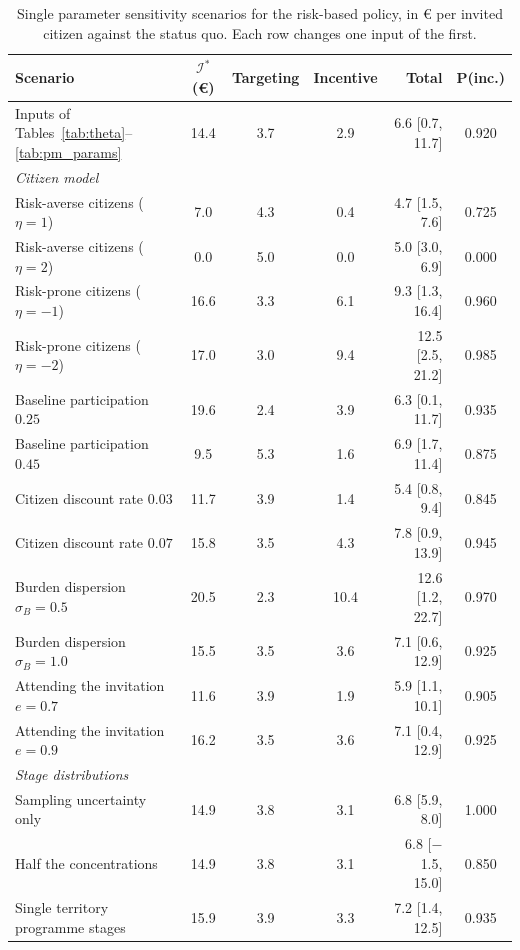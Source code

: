 \documentclass[12pt]{article}
\begin{document}
\begin{table}[h!]
\centering
\footnotesize
\caption{Single parameter sensitivity scenarios for the risk-based policy, in € per invited citizen against the status quo. Each row changes one input of the first.}
\label{tab:sensitivity}
\begin{tabular}{l c c c r c}
\toprule
\textbf{Scenario} & $\mathcal{I}^*$ (€) & \textbf{Targeting} & \textbf{Incentive} & \textbf{Total} & \textbf{P(inc.)} \\
\midrule
Inputs of Tables~\ref{tab:theta}--\ref{tab:pm_params} & 14.4 & 3.7 & 2.9 & 6.6 [0.7, 11.7] & 0.920 \\
\midrule
\multicolumn{6}{l}{\emph{Citizen model}} \\
Risk-averse citizens ($\eta = 1$) & 7.0 & 4.3 & 0.4 & 4.7 [1.5, 7.6] & 0.725 \\
Risk-averse citizens ($\eta = 2$) & 0.0 & 5.0 & 0.0 & 5.0 [3.0, 6.9] & 0.000 \\
Risk-prone citizens ($\eta = -1$) & 16.6 & 3.3 & 6.1 & 9.3 [1.3, 16.4] & 0.960 \\
Risk-prone citizens ($\eta = -2$) & 17.0 & 3.0 & 9.4 & 12.5 [2.5, 21.2] & 0.985 \\
Baseline participation $0.25$ & 19.6 & 2.4 & 3.9 & 6.3 [0.1, 11.7] & 0.935 \\
Baseline participation $0.45$ & 9.5 & 5.3 & 1.6 & 6.9 [1.7, 11.4] & 0.875 \\
Citizen discount rate $0.03$ & 11.7 & 3.9 & 1.4 & 5.4 [0.8, 9.4] & 0.845 \\
Citizen discount rate $0.07$ & 15.8 & 3.5 & 4.3 & 7.8 [0.9, 13.9] & 0.945 \\
Burden dispersion $\sigma_B = 0.5$ & 20.5 & 2.3 & 10.4 & 12.6 [1.2, 22.7] & 0.970 \\
Burden dispersion $\sigma_B = 1.0$ & 15.5 & 3.5 & 3.6 & 7.1 [0.6, 12.9] & 0.925 \\
Attending the invitation $e = 0.7$ & 11.6 & 3.9 & 1.9 & 5.9 [1.1, 10.1] & 0.905 \\
Attending the invitation $e = 0.9$ & 16.2 & 3.5 & 3.6 & 7.1 [0.4, 12.9] & 0.925 \\
\midrule
\multicolumn{6}{l}{\emph{Stage distributions}} \\
Sampling uncertainty only & 14.9 & 3.8 & 3.1 & 6.8 [5.9, 8.0] & 1.000 \\
Half the concentrations & 14.9 & 3.8 & 3.1 & 6.8 [$-$1.5, 15.0] & 0.850 \\
Single territory programme stages & 15.9 & 3.9 & 3.3 & 7.2 [1.4, 12.5] & 0.935 \\

\end{tabular}
\end{table}
\end{document}
